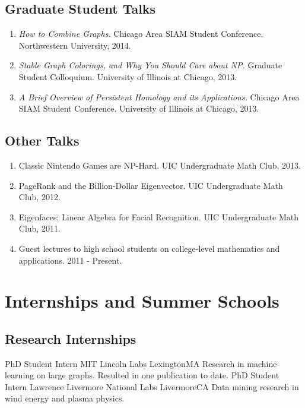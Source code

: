    \subsection{Graduate Student Talks}
      \begin{enumerate}
         \item {\em How to Combine Graphs.} Chicago Area SIAM Student Conference. Northwestern University, 2014.
         \item {\em Stable Graph Colorings, and Why You Should Care about NP.} Graduate Student Colloquium. University of Illinois at Chicago, 2013.
         \item {\em A Brief Overview of Persistent Homology and its Applications.} Chicago Area SIAM Student Conference. University of Illinois at Chicago, 2013.
      \end{enumerate}

   \subsection{Other Talks}
      \begin{enumerate}
         \item Classic Nintendo Games are NP-Hard. UIC Undergraduate Math Club, 2013.
         \item PageRank and the Billion-Dollar Eigenvector. UIC Undergraduate Math Club, 2012.
         \item Eigenfaces: Linear Algebra for Facial Recognition. UIC Undergraduate Math Club, 2011.
         \item Guest lectures to high school students on college-level mathematics and applications. 2011 - Present.
      \end{enumerate}
   

   \section{Internships and Summer Schools}
      \subsection{Research Internships}
               {PhD Student Intern}
               {MIT Lincoln Labs}
               {Lexington}{MA}
               {Research in machine learning on large graphs. Resulted in one publication to date.}
               {PhD Student Intern}
               {Lawrence Livermore National Labs}
               {Livermore}{CA}
               {Data mining research in wind energy and plasma physics.}

